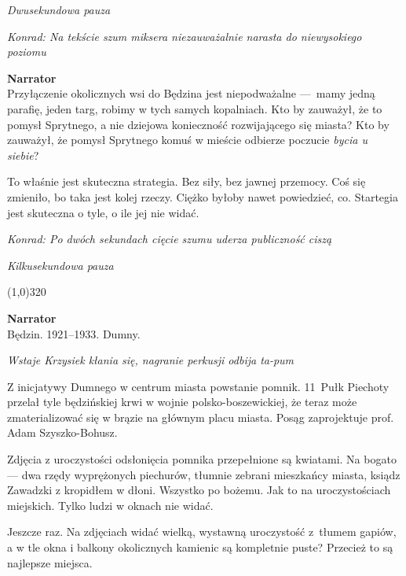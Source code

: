\documentclass[11pt,a4paper,oneside]{article}
\begin{document}
{\color{light-gray} \emph{Dwusekundowa pauza}}

{\color{konrad} \emph{Konrad: Na tekście szum miksera niezauważalnie narasta do niewysokiego poziomu}}

\textbf{Narrator}\\
Przyłączenie okolicznych wsi do Będzina jest niepodważalne \mbox{---}~mamy
jedną parafię, jeden targ, robimy w  tych samych kopalniach. Kto by
zauważył, że to pomysł Sprytnego, a nie dziejowa konieczność
rozwijającego się miasta?  Kto by zauważył, że pomysł Sprytnego komuś
w mieście odbierze poczucie \emph{bycia u siebie}?

To właśnie jest skuteczna strategia. Bez siły, bez jawnej przemocy.
Coś się zmieniło, bo taka jest kolej rzeczy.  Ciężko byłoby nawet
powiedzieć, co. Startegia jest skuteczna o tyle, o ile jej nie widać. 

{\color{konrad} \emph{Konrad: Po dwóch sekundach cięcie szumu uderza publiczność ciszą}}

{\color{light-gray} \emph{Kilkusekundowa pauza}}


\line(1,0){320}

\textbf{Narrator}\\
Będzin. 1921--1933. Dumny. 

{\color{light-gray} \emph{Wstaje Krzysiek kłania się, nagranie
perkusji odbija ta-pum}}

Z inicjatywy Dumnego w centrum miasta powstanie pomnik. 11~Pułk Piechoty 
przelał tyle będzińskiej krwi w wojnie polsko-boszewickiej, że teraz
może zmaterializować się w brązie na głównym placu miasta. Posąg
zaprojektuje prof. Adam Szyszko-Bohusz.

Zdjęcia z uroczystości odsłonięcia pomnika przepełnione są kwiatami.
Na bogato --- dwa rzędy wyprężonych piechurów, tłumnie zebrani
mieszkańcy miasta, ksiądz Zawadzki z kropidłem w dłoni. Wszystko po
bożemu. Jak to na uroczystościach miejskich. Tylko ludzi w oknach nie
widać.

Jeszcze raz. Na zdjęciach widać wielką, wystawną uroczystość z~tłumem
gapiów, a w tle okna i balkony okolicznych kamienic są kompletnie puste? 
Przecież to są najlepsze miejsca. 


%
%
\end{document}
